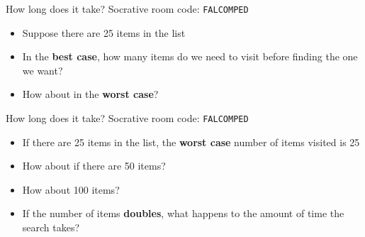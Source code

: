 \begin{frame}{How long does it take?}
	Socrative room code: \texttt{FALCOMPED}
	\begin{itemize}
		\item Suppose there are 25 items in the list \pause
		\item In the \textbf{best case}, how many items do we need to visit before finding the one we want? \pause
		\item How about in the \textbf{worst case}?
	\end{itemize}
\end{frame}

\begin{frame}{How long does it take?}
	Socrative room code: \texttt{FALCOMPED}
	\begin{itemize}
		\item If there are 25 items in the list, the \textbf{worst case} number of items visited is 25 \pause
		\item How about if there are 50 items? \pause
		\item How about 100 items? \pause
		\item If the number of items \textbf{doubles}, what happens to the amount of time the search takes?
	\end{itemize}
\end{frame}

